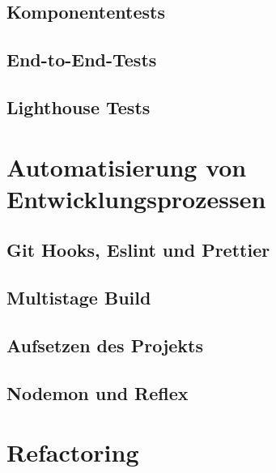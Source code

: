 
\subsection{Komponententests}

\subsection{End-to-End-Tests}

\subsection{Lighthouse Tests}

\section{Automatisierung von Entwicklungsprozessen}
\subsection{Git Hooks, Eslint und Prettier}
\subsection{Multistage Build}
\subsection{Aufsetzen des Projekts}
\subsection{Nodemon und Reflex}

\section{Refactoring}

